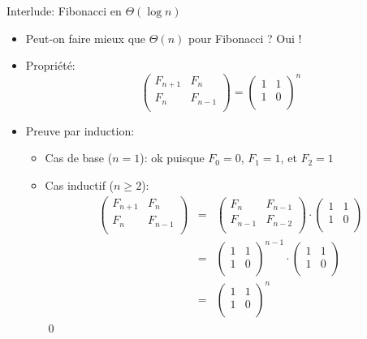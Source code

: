 \begin{frame}{Interlude: Fibonacci en $\Theta(\log n)$}
\begin{itemize}
\item Peut-on faire mieux que $\Theta(n)$ pour Fibonacci ? Oui !
\item Propriété: {\small $$\begin{pmatrix} F_{n+1} &F_n\\F_n&F_{n-1}\\\end{pmatrix}=\begin{pmatrix} 1&1\\1&0\\\end{pmatrix}^n$$}
\item Preuve par induction:
\begin{itemize}
\item Cas de base ($n=1$): ok puisque $F_0=0$, $F_1=1$, et $F_2=1$
\item Cas inductif ($n\geq 2$):
{\small
\begin{eqnarray*}
\begin{pmatrix} F_{n+1} &F_n\\F_n&F_{n-1}\\\end{pmatrix} & = & \begin{pmatrix} F_{n} &F_{n-1}\\F_{n-1}&F_{n-2}\\\end{pmatrix} \cdot \begin{pmatrix} 1&1\\1&0\\\end{pmatrix}\\
& =&  \begin{pmatrix} 1&1\\1&0\\\end{pmatrix}^{n-1} \cdot \begin{pmatrix} 1&1\\1&0\\\end{pmatrix}\\
& = & \begin{pmatrix} 1&1\\1&0\\\end{pmatrix}^{n}
\end{eqnarray*}}\qed
\end{itemize}
\end{itemize}

\end{frame}

